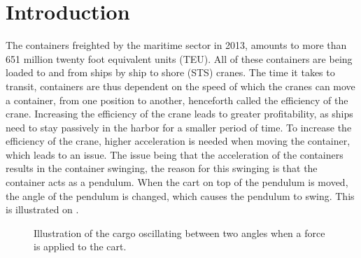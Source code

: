 \chapter{Introduction}
\label{indledning}

The containers freighted by the maritime sector in 2013, amounts to more than 651 million twenty foot equivalent units (TEU). All of these containers are being loaded to and from ships by ship to shore (STS) cranes. The time it takes to transit, containers are thus dependent on the speed of which the cranes can move a container, from one position to another, henceforth called the efficiency of the crane. Increasing the efficiency of the crane leads to greater profitability, as ships need to stay passively in the harbor for a smaller period of time. To increase the efficiency of the crane, higher acceleration is needed when moving the container, which leads to an issue. The issue being that the acceleration of the containers results in the container swinging, the reason for this swinging is that the container acts as a pendulum. When the cart on top of the pendulum is moved, the angle of the pendulum is changed, which causes the pendulum to swing. This is illustrated on .
\begin{figure}[H]
\centering
{}
\caption{Illustration of the cargo oscillating between two angles when a force is applied to the cart.}
\label{IntroductionPic}
\end{figure}




